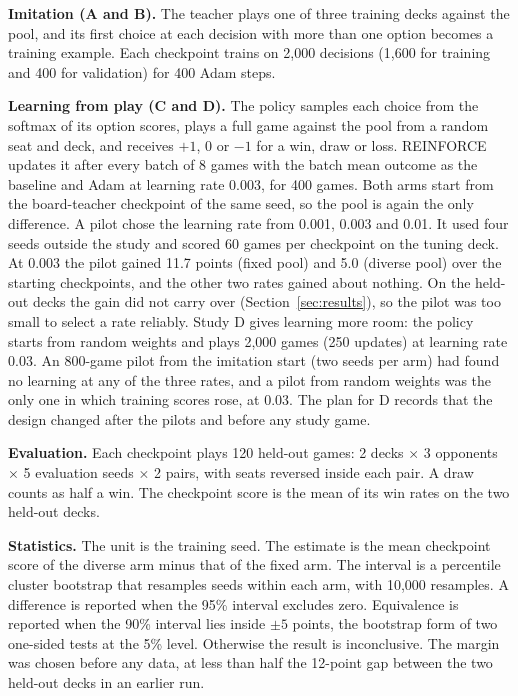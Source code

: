 \documentclass[conference]{IEEEtran}
\begin{document}
\textbf{Imitation (A and B).} The teacher plays one of three training decks against the pool, and its first choice at each decision with more than one option becomes a training example. Each checkpoint trains on 2,000 decisions (1,600 for training and 400 for validation) for 400 Adam steps.

\textbf{Learning from play (C and D).} The policy samples each choice from the softmax of its option scores, plays a full game against the pool from a random seat and deck, and receives $+1$, $0$ or $-1$ for a win, draw or loss. REINFORCE updates it after every batch of 8 games with the batch mean outcome as the baseline and Adam at learning rate 0.003, for 400 games. Both arms start from the board-teacher checkpoint of the same seed, so the pool is again the only difference. A pilot chose the learning rate from 0.001, 0.003 and 0.01. It used four seeds outside the study and scored 60 games per checkpoint on the tuning deck. At 0.003 the pilot gained 11.7 points (fixed pool) and 5.0 (diverse pool) over the starting checkpoints, and the other two rates gained about nothing. On the held-out decks the gain did not carry over (Section~\ref{sec:results}), so the pilot was too small to select a rate reliably. Study D gives learning more room: the policy starts from random weights and plays 2,000 games (250 updates) at learning rate 0.03. An 800-game pilot from the imitation start (two seeds per arm) had found no learning at any of the three rates, and a pilot from random weights was the only one in which training scores rose, at 0.03. The plan for D records that the design changed after the pilots and before any study game.

\textbf{Evaluation.} Each checkpoint plays 120 held-out games: 2 decks $\times$ 3 opponents $\times$ 5 evaluation seeds $\times$ 2 pairs, with seats reversed inside each pair. A draw counts as half a win. The checkpoint score is the mean of its win rates on the two held-out decks.

\textbf{Statistics.} The unit is the training seed. The estimate is the mean checkpoint score of the diverse arm minus that of the fixed arm. The interval is a percentile cluster bootstrap that resamples seeds within each arm, with 10,000 resamples. A difference is reported when the 95\% interval excludes zero. Equivalence is reported when the 90\% interval lies inside $\pm 5$ points, the bootstrap form of two one-sided tests at the 5\% level. Otherwise the result is inconclusive. The margin was chosen before any data, at less than half the 12-point gap between the two held-out decks in an earlier run.
\end{document}
